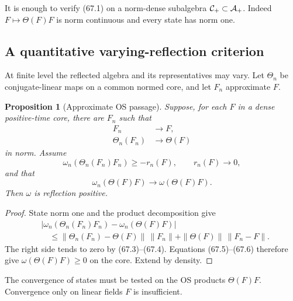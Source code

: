\documentclass[11pt]{article}
\newtheorem{proposition}[theorem]{Proposition}
\theoremstyle{remark}
\begin{document}
It is enough to verify (67.1) on a norm-dense subalgebra
\({\cal C}_+\subset{\cal A}_+\).  Indeed
\(F\mapsto\Theta(F)F\) is norm continuous and every state has norm
one.

\subsection{A quantitative varying-reflection criterion}

At finite level the reflected algebra and its representatives may
vary.  Let \(\Theta_n\) be conjugate-linear maps on a common
normed core, and let \(F_n\) approximate \(F\).

\begin{proposition}[Approximate OS passage]
\label{prop:v12v67-OS-approx}
Suppose, for each \(F\) in a dense positive-time core, there are
\(F_n\) such that
\begin{align}
 F_n&\longrightarrow F,                           \tag{67.3}\\
 \Theta_n(F_n)&\longrightarrow\Theta(F)            \tag{67.4}
\end{align}
in norm.  Assume
\begin{equation}
 \omega_n(\Theta_n(F_n)F_n)\geq-r_n(F),
 \qquad r_n(F)\longrightarrow0,                   \tag{67.5}
\end{equation}
and that
\begin{equation}
 \omega_n(\Theta(F)F)\longrightarrow
 \omega(\Theta(F)F).                              \tag{67.6}
\end{equation}
Then \(\omega\) is reflection positive.
\end{proposition}

\begin{proof}
State norm one and the product decomposition give
\begin{align}
 &\left|
 \omega_n(\Theta_n(F_n)F_n)
 -
 \omega_n(\Theta(F)F)
 \right|                                          \nonumber\\
 &\quad\leq
 \|\Theta_n(F_n)-\Theta(F)\|\,\|F_n\|
 +
 \|\Theta(F)\|\,\|F_n-F\|.                        \tag{67.7}
\end{align}
The right side tends to zero by (67.3)--(67.4).  Equations
(67.5)--(67.6) therefore give
\(\omega(\Theta(F)F)\geq0\) on the core.  Extend by density.
\end{proof}

The convergence of states must be tested on the OS products
\(\Theta(F)F\).  Convergence only on linear fields \(F\) is
insufficient.
\end{document}
